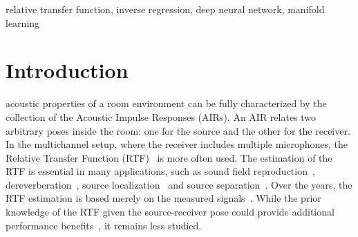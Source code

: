 \documentclass[journal]{IEEEtran}
\begin{document}
\begin{IEEEkeywords}
relative transfer function, inverse regression, deep neural network, manifold learning
\end{IEEEkeywords}

%
\IEEEpeerreviewmaketitle


\section{Introduction}


 acoustic properties of a room environment can be fully characterized by the collection of the Acoustic Impulse Responses (AIRs). An AIR relates two arbitrary poses inside the room: one for the source and the other for the receiver. In the multichannel setup, where the receiver includes multiple microphones, the Relative Transfer Function (RTF)~\cite{gannot2001signal} is more often used. The estimation of the RTF is essential in many applications, such as sound field reproduction~\cite{betlehem2005theory}, dereverberation~\cite{lin2007blind}, source localization~\cite{li2015estimation} and source separation~\cite{koldovsky2015spatial}. Over the years, the RTF estimation is based merely on the measured signals~\cite{cohen2004relative,talmon2009relative,taseska2015relative}. While the prior knowledge of the RTF given the source-receiver pose could provide additional performance benefits~\cite{talmon2013relative}, it remains less studied.
\end{document}
